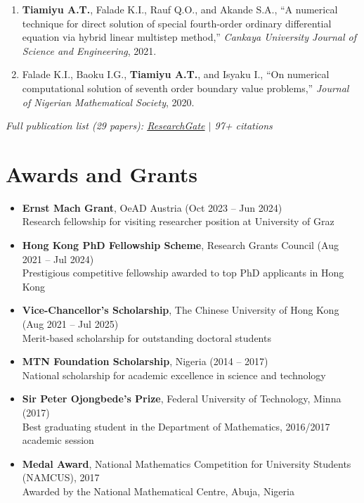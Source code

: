 \documentclass[11pt,a4paper]{article}
\newcommand{\publication}[4]{%
    \item #1, ``#2,'' \textit{#3}, #4.%
}
\begin{document}
\begin{enumerate}[leftmargin=1.5em, itemsep=3pt]
    \publication{\textbf{Tiamiyu A.T.}, Falade K.I., Rauf Q.O., and Akande S.A.}{A numerical technique for direct solution of special fourth-order ordinary differential equation via hybrid linear multistep method}{Cankaya University Journal of Science and Engineering}{2021}
    
    \publication{Falade K.I., Baoku I.G., \textbf{Tiamiyu A.T.}, and Isyaku I.}{On numerical computational solution of seventh order boundary value problems}{Journal of Nigerian Mathematical Society}{2020}
\end{enumerate}

\vspace{4pt}
\noindent\textit{Full publication list (29 papers): \href{https://www.researchgate.net/profile/Abdgafar-Tiamiyu}{ResearchGate} $\vert$ 97+ citations}

\section{Awards and Grants}

\begin{itemize}[leftmargin=1.5em, itemsep=3pt]
    \item \textbf{Ernst Mach Grant}, OeAD Austria (Oct 2023 -- Jun 2024)\\
    Research fellowship for visiting researcher position at University of Graz
    
    \item \textbf{Hong Kong PhD Fellowship Scheme}, Research Grants Council (Aug 2021 -- Jul 2024)\\
    Prestigious competitive fellowship awarded to top PhD applicants in Hong Kong
    
    \item \textbf{Vice-Chancellor's Scholarship}, The Chinese University of Hong Kong (Aug 2021 -- Jul 2025)\\
    Merit-based scholarship for outstanding doctoral students
    
    \item \textbf{MTN Foundation Scholarship}, Nigeria (2014 -- 2017)\\
    National scholarship for academic excellence in science and technology
    
    \item \textbf{Sir Peter Ojongbede's Prize}, Federal University of Technology, Minna (2017)\\
    Best graduating student in the Department of Mathematics, 2016/2017 academic session
    
    \item \textbf{Medal Award}, National Mathematics Competition for University Students (NAMCUS), 2017\\
    Awarded by the National Mathematical Centre, Abuja, Nigeria
\end{itemize}
\end{document}
